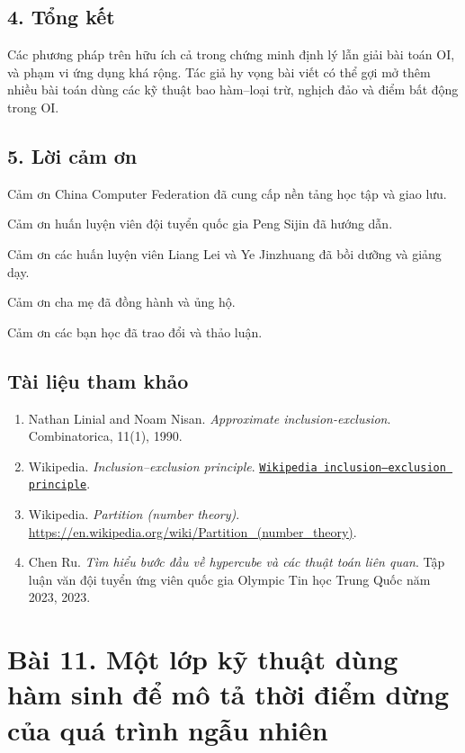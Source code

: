 \documentclass[11pt]{article}
\begin{document}
\subsection*{4. Tổng kết}

Các phương pháp trên hữu ích cả trong chứng minh định lý lẫn giải bài toán OI,
và phạm vi ứng dụng khá rộng. Tác giả hy vọng bài viết có thể gợi mở thêm
nhiều bài toán dùng các kỹ thuật bao hàm--loại trừ, nghịch đảo và điểm bất
động trong OI.

\subsection*{5. Lời cảm ơn}

Cảm ơn China Computer Federation đã cung cấp nền tảng học tập và giao lưu.

Cảm ơn huấn luyện viên đội tuyển quốc gia Peng Sijin đã hướng dẫn.

Cảm ơn các huấn luyện viên Liang Lei và Ye Jinzhuang đã bồi dưỡng và giảng dạy.

Cảm ơn cha mẹ đã đồng hành và ủng hộ.

Cảm ơn các bạn học đã trao đổi và thảo luận.

\subsection*{Tài liệu tham khảo}

\begin{enumerate}
  \item Nathan Linial and Noam Nisan. \emph{Approximate inclusion-exclusion}.
  Combinatorica, 11(1), 1990.
  \item Wikipedia. \emph{Inclusion--exclusion principle}.
  \href{https://en.wikipedia.org/wiki/Inclusion-exclusion_principle}{\texttt{Wikipedia inclusion--exclusion principle}}.
  \item Wikipedia. \emph{Partition (number theory)}.
  \url{https://en.wikipedia.org/wiki/Partition_(number_theory)}.
  \item Chen Ru. \emph{Tìm hiểu bước đầu về hypercube và các thuật toán liên
  quan}. Tập luận văn đội tuyển ứng viên quốc gia Olympic Tin học Trung Quốc
  năm 2023, 2023.
\end{enumerate}

\section*{Bài 11. Một lớp kỹ thuật dùng hàm sinh để mô tả thời điểm dừng của quá trình ngẫu nhiên}
\end{document}
